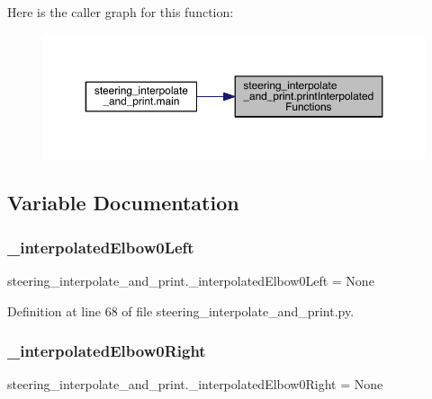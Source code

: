 Here is the caller graph for this function\+:\nopagebreak
\begin{figure}[H]
\begin{center}
\leavevmode
\includegraphics[width=350pt]{namespacesteering__interpolate__and__print_a43ddc2f8fb0425e973a504a5d38289c2_icgraph}
\end{center}
\end{figure}


\subsection{Variable Documentation}
\mbox{\label{namespacesteering__interpolate__and__print_a523a7087a95e5bc05c35455b293f7efb}} 
\subsubsection{\texorpdfstring{\_interpolatedElbow0Left}{\_interpolatedElbow0Left}}
{\footnotesize\ttfamily steering\+\_\+interpolate\+\_\+and\+\_\+print.\+\_\+interpolated\+Elbow0\+Left = None\hspace{0.3cm}{\ttfamily [private]}}



Definition at line 68 of file steering\+\_\+interpolate\+\_\+and\+\_\+print.\+py.

\mbox{\label{namespacesteering__interpolate__and__print_a662b8bcfba342c150cec7500a5bc3791}} 
\subsubsection{\texorpdfstring{\_interpolatedElbow0Right}{\_interpolatedElbow0Right}}
{\footnotesize\ttfamily steering\+\_\+interpolate\+\_\+and\+\_\+print.\+\_\+interpolated\+Elbow0\+Right = None\hspace{0.3cm}{\ttfamily [private]}}



